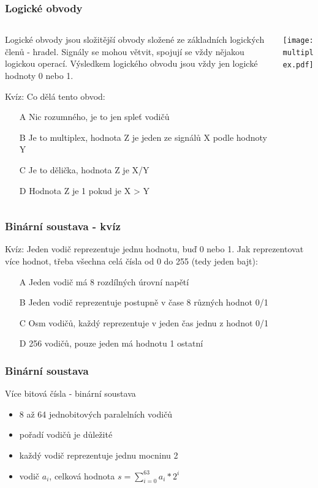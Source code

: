 \documentclass{beamer}
\begin{document}
\begin{frame}
\frametitle{Logické obvody}

\begin{columns}
\begin{column}{0.55\textwidth}
Logické obvody jsou složitější obvody složené ze základních logických členů - hradel. Signály se mohou větvit, spojují se vždy nějakou logickou operací.
Výsledkem logického obvodu jsou vždy jen logické hodnoty 0 nebo 1.

\bigskip

Kvíz: Co dělá tento obvod:
\begin{itemize}
\item[A] Nic rozumného, je to jen spleť vodičů
\item[B] Je to multiplex, hodnota Z je jeden ze signálů X podle hodnoty Y
\item[C] Je to dělička, hodnota Z je X/Y
\item[D] Hodnota Z je 1 pokud je X > Y 
\end{itemize}
\end{column}
\begin{column}{0.45\textwidth}  
\begin{center}
   \texttt{[image: multiplex.pdf]}
\end{center}
\end{column}
\end{columns}


\end{frame}


\begin{frame}
\frametitle{Binární soustava - kvíz}

Kvíz: Jeden vodič reprezentuje jednu hodnotu, buď 0 nebo 1. Jak reprezentovat více hodnot, třeba všechna celá čísla od 0 do 255 (tedy jeden bajt):
\begin{itemize}
\item[A] Jeden vodič má 8 rozdílných úrovní napětí
\item[B] Jeden vodič reprezentuje postupně v čase 8 různých hodnot 0/1
\item[C] Osm vodičů, každý reprezentuje v jeden čas jednu z hodnot 0/1
\item[D] 256 vodičů, pouze jeden má hodnotu 1 ostatní 
\end{itemize}


\end{frame}


\begin{frame}
\frametitle{Binární soustava}

Více bitová čísla - binární soustava
\begin{itemize}
\item 8 až 64 jednobitových paralelních vodičů
\item pořadí vodičů je důležité
\item každý vodič reprezentuje jednu mocninu 2
\item vodič $a_{i}$, celková hodnota $s = \sum_{i=0}^{63} a_{i}*2^{i}$
\end{itemize}

\end{frame}
\end{document}
